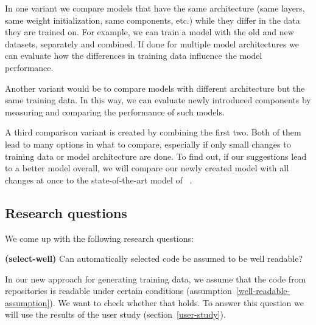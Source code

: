 \documentclass[%
class=scrreprt,
chapterprefix=false,%
open=right,%
twoside=false,%
paper=a4,%
logofile={Logo\_zentral\_farbig\_EN.png},%
thesistype=master,%
UKenglish,%
]{se2thesis}
\begin{document}
	In one variant we compare models that have the same architecture (same layers, same weight initialization, same components, etc.) while they differ in the data they are trained on. For example, we can train a model with the old and new datasets, separately and combined. If done for multiple model architectures we can evaluate how the differences in training data influence the model performance. 
	
	Another variant would be to compare models with different architecture but the same training data. In this way, we can evaluate newly introduced components by measuring and comparing the performance of such models.

	A third comparison variant is created by combining the first two. Both of them lead to many options in what to compare, especially if only small changes to training data or model architecture are done. To find out, if our suggestions lead to a better model overall, we will compare our newly created model with all changes at once to the state-of-the-art model of \citeauthor{mi2022towards}~\cite{mi2022towards}.
	
	\subsection{Research questions}\label{research-questions}
	We come up with the following research questions:
	
	
	\begin{resq} \textbf{(select-well)} Can automatically selected code be assumed to be well readable?\end{resq} \label{select-well}
	In our new approach for generating training data, we assume that the code from repositories is readable under certain conditions (assumption~\ref{well-readable-assumption}). We want to check whether that holds. To answer this question we will use the results of the user study (section~\ref{user-study}).
	
\end{document}
